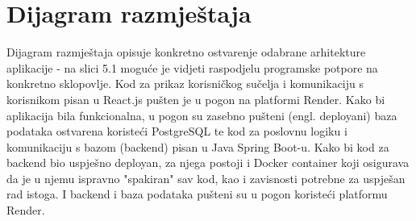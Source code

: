 			 
			
		
		
		\section{Dijagram razmještaja}
			

                Dijagram razmještaja opisuje konkretno ostvarenje odabrane arhitekture aplikacije - na slici 5.1 moguće je vidjeti raspodjelu programske potpore na konkretno sklopovlje. Kod za prikaz korisničkog sučelja i komunikaciju s korisnikom pisan u React.js pušten je u pogon na platformi Render. Kako bi aplikacija bila funkcionalna, u pogon su zasebno pušteni (engl. deployani) baza podataka ostvarena koristeći PostgreSQL te kod za poslovnu logiku i komunikaciju s bazom (backend) pisan u Java Spring Boot-u. Kako bi kod za backend bio uspješno deployan, za njega postoji i Docker container koji osigurava da je u njemu ispravno "spakiran" sav kod, kao i zavisnosti potrebne za uspješan rad istoga. I backend i baza podataka pušteni su u pogon koristeći platformu Render. \\

